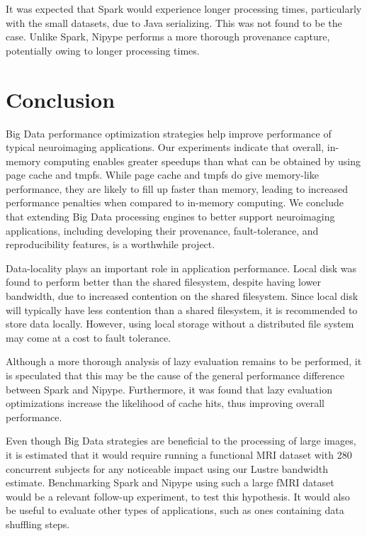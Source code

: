 \documentclass{IEEEtran}
\begin{document}
It was expected that Spark would experience longer processing times, particularly
with the small datasets, due to Java serializing. This was not found to be the case. 
Unlike Spark, Nipype performs a more thorough provenance capture, potentially owing to longer
processing times.

\section{Conclusion} %
\label{sec:conclusion}

Big Data performance optimization strategies help improve performance of typical 
neuroimaging applications. Our experiments indicate that overall, in-memory computing 
enables greater speedups than what can be obtained by using page cache 
and tmpfs. While page cache and tmpfs do give memory-like performance, 
they are likely to fill up faster than memory, leading to increased 
performance penalties when compared to in-memory computing. We conclude 
that extending Big Data processing engines to better support 
neuroimaging applications, including developing their provenance, 
fault-tolerance, and reproducibility features, is a worthwhile project.

Data-locality plays an important role in application 
performance. Local disk was found to perform better than the shared 
filesystem, despite having lower bandwidth, due to increased contention on 
the shared filesystem. Since local disk will typically have less 
contention than a shared filesystem, it is recommended to store data locally.
However, using local storage without a distributed file system 
may come at a cost to fault tolerance.

Although a more thorough analysis of lazy evaluation remains to be 
performed, it is speculated that this may be the cause of the general 
performance difference between Spark and Nipype. Furthermore, it was
found that lazy evaluation optimizations increase the likelihood of 
cache hits, thus improving overall performance.

Even though Big Data strategies are beneficial to the processing of 
large images, it is estimated that it would require running a 
functional MRI dataset with 280 concurrent subjects for any noticeable 
impact using our Lustre bandwidth estimate. Benchmarking Spark and 
Nipype using such a large fMRI dataset would be a relevant follow-up 
experiment, to test this hypothesis. It would also be useful to evaluate
other types of applications, such as ones containing data shuffling steps.
\end{document}
